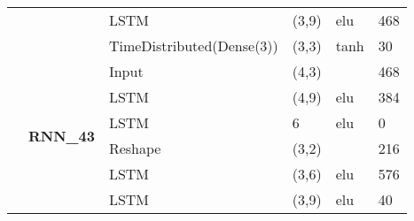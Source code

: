 \begin{table}[H]
\begin{center}
\begin{tabular}{ll|l|l|l|l|}
\multicolumn{1}{|l|}{}                                                                 &                                   & LSTM                               & (3,9)                                & elu                                     & 468                                         \\ \cline{3-6} 
\multicolumn{1}{|l|}{}                                                                 &                                   & TimeDistributed(Dense(3))          & (3,3)                                & tanh                                     & 30                                          \\ \cline{2-6} 
\multicolumn{1}{|l|}{}                                                                 & \multirow{8}{*}{\textbf{RNN\_43}} & Input                              & (4,3)                                &                                          & 468                                         \\ \cline{3-6} 
\multicolumn{1}{|l|}{}                                                                 &                                   & LSTM                               & (4,9)                                & elu                                     & 384                                         \\ \cline{3-6} 
\multicolumn{1}{|l|}{}                                                                 &                                   & LSTM                               & 6                                    & elu                                     & 0                                           \\ \cline{3-6} 
\multicolumn{1}{|l|}{}                                                                 &                                   & Reshape                            & (3,2)                                &                                          & 216                                         \\ \cline{3-6} 
\multicolumn{1}{|l|}{}                                                                 &                                   & LSTM                               & (3,6)                                & elu                                     & 576                                         \\ \cline{3-6} 
\multicolumn{1}{|l|}{}                                                                 &                                   & LSTM                               & (3,9)                                & elu                                     & 40                                          \\ \cline{3-6} 

\end{tabular}
\end{center}
\end{table}
